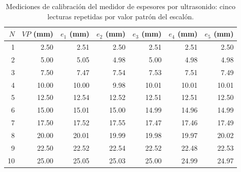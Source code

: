 \begin{table}[H]
\centering
\caption{Mediciones de calibración del medidor de espesores por ultrasonido: cinco lecturas repetidas por valor patrón del escalón.}
\label{tab:ut-datos}
\begin{tabular}{rrrrrrr}
\toprule
$N$ & $VP$ (mm) & $e_1$ (mm) & $e_2$ (mm) & $e_3$ (mm) & $e_4$ (mm) & $e_5$ (mm) \\
\midrule
1 & 2.50 & 2.51 & 2.50 & 2.51 & 2.51 & 2.50 \\
2 & 5.00 & 5.05 & 4.98 & 5.00 & 4.98 & 4.98 \\
3 & 7.50 & 7.47 & 7.54 & 7.53 & 7.51 & 7.49 \\
4 & 10.00 & 10.00 & 9.98 & 10.01 & 10.01 & 10.01 \\
5 & 12.50 & 12.54 & 12.52 & 12.51 & 12.51 & 12.50 \\
6 & 15.00 & 15.01 & 15.00 & 14.99 & 14.96 & 14.99 \\
7 & 17.50 & 17.52 & 17.55 & 17.47 & 17.46 & 17.49 \\
8 & 20.00 & 20.01 & 19.99 & 19.98 & 19.97 & 20.02 \\
9 & 22.50 & 22.52 & 22.54 & 22.52 & 22.48 & 22.53 \\
10 & 25.00 & 25.05 & 25.03 & 25.00 & 24.99 & 24.97 \\
\bottomrule
\end{tabular}
\end{table}
